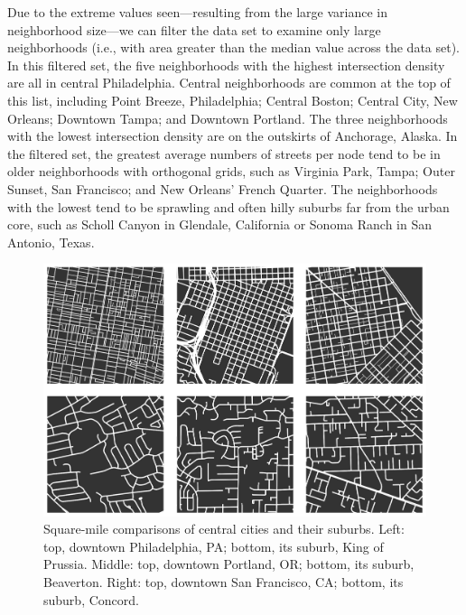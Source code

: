 \documentclass[Afour,sageh,times]{sagej}
\begin{document}
Due to the extreme values seen---resulting from the large variance in neighborhood size---we can filter the data set to examine only large neighborhoods (i.e., with area greater than the median value across the data set). In this filtered set, the five neighborhoods with the highest intersection density are all in central Philadelphia. Central neighborhoods are common at the top of this list, including Point Breeze, Philadelphia; Central Boston; Central City, New Orleans; Downtown Tampa; and Downtown Portland. The three neighborhoods with the lowest intersection density are on the outskirts of Anchorage, Alaska. In the filtered set, the greatest average numbers of streets per node tend to be in older neighborhoods with orthogonal grids, such as Virginia Park, Tampa; Outer Sunset, San Francisco; and New Orleans' French Quarter. The neighborhoods with the lowest tend to be sprawling and often hilly suburbs far from the urban core, such as Scholl Canyon in Glendale, California or Sonoma Ranch in San Antonio, Texas.

\begin{figure}
	\includegraphics[width=1\textwidth]{fig05.png}
	\caption{Square-mile comparisons of central cities and their suburbs. Left: top, downtown Philadelphia, PA; bottom, its suburb, King of Prussia. Middle: top, downtown Portland, OR; bottom, its suburb, Beaverton. Right: top, downtown San Francisco, CA; bottom, its suburb, Concord.}
	\label{fig05}
\end{figure}
\end{document}
